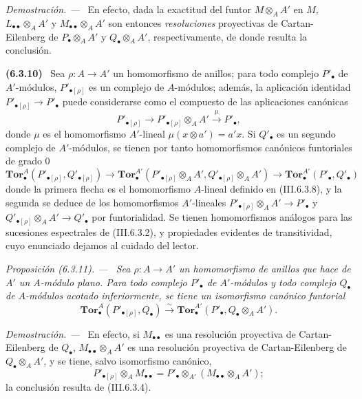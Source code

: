 \documentclass[10pt,oneside]{book}
\newcommand{\sref}[2][]{\textup{(#2)}}
\newcommand{\oldpage}[2][]{\setcounter{footnote}{0}\marginpar{\scriptsize\textbf{#1}~|~#2}\ignorespaces}
\newenvironment{env}[1][]{\par\medskip\noindent\textbf{(#1)}\ }{\par}
\newenvironment{proposition}[1][]{\par\medskip\noindent\itshape Proposición (#1). ---\ }{\par}
\newenvironment{proof}{\par\medskip\noindent\textit{Demostración. ---\ }}{\par}
\begin{document}
\begin{proof}
\oldpage[III]{145}
En efecto, dada la exactitud del funtor $M\otimes_A A'$ en $M$,
$L_{\bullet\bullet}\otimes_A A'$ y $M_{\bullet\bullet}\otimes_A A'$ son
entonces \emph{resoluciones} proyectivas de Cartan-Eilenberg de
$P_\bullet\otimes_A A'$ y $Q_\bullet\otimes_A A'$, respectivamente, de
donde resulta la conclusión.
\end{proof}

\begin{env}[6.3.10]
\label{III.6.3.10}
Sea $\rho:A\to A'$ un homomorfismo de anillos; para todo complejo
$P'_\bullet$ de $A'$-módulos, $P'_{\bullet[\rho]}$ es un complejo de
$A$-módulos; además, la aplicación identidad
$P'_{\bullet[\rho]}\to P'_\bullet$ puede considerarse como el compuesto de
las aplicaciones canónicas
\[
  P'_{\bullet[\rho]}\longrightarrow
  P'_{\bullet[\rho]}\otimes_A A'
  \xrightarrow{\mu}P'_\bullet,
\]
donde $\mu$ es el homomorfismo $A'$-lineal $\mu(x\otimes a')=a'x$. Si
$Q'_\bullet$
es un segundo complejo de $A'$-módulos, se tienen por tanto homomorfismos
canónicos funtoriales de grado 0
\[
  \mathbf{Tor}_\bullet^A(P'_{\bullet[\rho]},Q'_{\bullet[\rho]})
  \longrightarrow
  \mathbf{Tor}_\bullet^{A'}
  (P'_{\bullet[\rho]}\otimes_A A',Q'_{\bullet[\rho]}\otimes_A A')
  \longrightarrow
  \mathbf{Tor}_\bullet^{A'}(P'_\bullet,Q'_\bullet)
  \tag{6.3.10.1}\label{III.6.3.10.1}
\]
donde la primera flecha es el homomorfismo $A$-lineal definido en
\sref{III.6.3.8}, y la
segunda se deduce de los homomorfismos $A'$-lineales
$P'_{\bullet[\rho]}\otimes_A A'\to P'_\bullet$ y
$Q'_{\bullet[\rho]}\otimes_A A'\to Q'_\bullet$ por funtorialidad. Se tienen
homomorfismos análogos para las sucesiones espectrales de
\sref{III.6.3.2}, y
propiedades evidentes de transitividad, cuyo enunciado dejamos al cuidado del
lector.
\end{env}

\begin{proposition}[6.3.11]
\label{III.6.3.11}
Sea $\rho:A\to A'$ un homomorfismo de anillos que hace de $A'$ un
$A$-módulo plano. Para todo complejo $P'_\bullet$ de $A'$-módulos y todo
complejo $Q_\bullet$ de $A$-módulos acotado inferiormente, se tiene un
isomorfismo canónico funtorial
\[
  \mathbf{Tor}_\bullet^A(P'_{\bullet[\rho]},Q_\bullet)
  \xrightarrow{\sim}
  \mathbf{Tor}_\bullet^{A'}(P'_\bullet,Q_\bullet\otimes_A A').
  \tag{6.3.11.1}\label{III.6.3.11.1}
\]
\end{proposition}

\begin{proof}
En efecto, si $M_{\bullet\bullet}$ es una resolución proyectiva de
Cartan-Eilenberg de $Q_\bullet$, $M_{\bullet\bullet}\otimes_A A'$ es una
resolución proyectiva de Cartan-Eilenberg de $Q_\bullet\otimes_A A'$, y se
tiene, salvo isomorfismo canónico,
\[
  P'_{\bullet[\rho]}\otimes_A M_{\bullet\bullet}
  =P'_\bullet\otimes_{A'}(M_{\bullet\bullet}\otimes_A A');
\]
la conclusión resulta de \sref{III.6.3.4}.
\end{proof}
\end{document}
